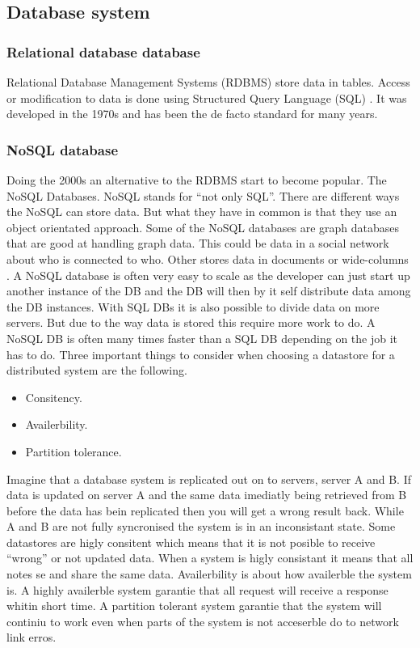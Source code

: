 \documentclass[a4paper,12pt,english]{article}
\begin{document}
\subsection{Database system}
\subsubsection{Relational database database}
Relational Database Management Systems (RDBMS) store data in tables. Access or modification to
data is done using Structured Query Language (SQL)
. It was developed in the 1970s and
has been the de facto standard for many years. 

\subsubsection{NoSQL database}
Doing the 2000s an alternative to the RDBMS start to become popular.
The NoSQL Databases. NoSQL stands for ``not only SQL''. There are different ways the NoSQL can store data. But what they have
in common is that they use an object orientated approach. Some of the NoSQL
databases are graph databases that are good at handling graph data. This could
be data in a social network about who is connected to who. Other stores data in
documents or wide-columns \cite{mongo}.
A NoSQL database is often very easy to scale as the developer can just start up
another instance of the DB and the DB will then by it self distribute data among
the DB instances. With SQL DBs it is also possible to divide data on more
servers. But due to the way data is stored this require more work to do. A NoSQL
DB is often many times faster than a SQL DB depending on the job it has to do.
 Three important things to consider when choosing a datastore for a distributed
 system are the following.
 
 \begin{itemize}
   \item Consitency.
   \item Availerbility.
   \item Partition tolerance.
 \end{itemize}
 
 Imagine that a database system is replicated out on to servers, server
 A and B. If data is updated on server A and the same data imediatly being
 retrieved from B before the data has bein replicated then you will get a wrong
 result back. While A and B are not fully syncronised the system is in an
 inconsistant state. Some datastores are higly consitent which means that it is
 not posible to receive ``wrong'' or not updated data. When a system is higly
 consistant it means that all notes se and share the same data.
 Availerbility is about how availerble the system is. A highly availerble
 system garantie that all request will receive a response whitin short time.
 A partition tolerant system garantie that the system will continiu to work even
 when parts of the system is not acceserble do to network link erros.
 
\end{document}
